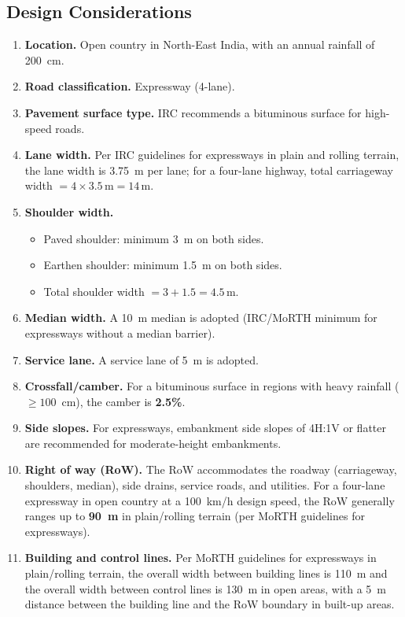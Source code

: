 \documentclass[11pt]{article}
\begin{document}
\subsection{Design Considerations}
\begin{enumerate}
  \item \textbf{Location.} Open country in North-East India, with an annual rainfall of 200~cm.
  \item \textbf{Road classification.} Expressway (4-lane).
  \item \textbf{Pavement surface type.} IRC recommends a bituminous surface for high-speed roads.
  \item \textbf{Lane width.} Per IRC guidelines for expressways in plain and rolling terrain, the lane
  width is 3.75~m per lane; for a four-lane highway, total carriageway width $= 4 \times 3.5\,\text{m} =
  14\,\text{m}$.
  \item \textbf{Shoulder width.}
  \begin{itemize}
    \item Paved shoulder: minimum 3~m on both sides.
    \item Earthen shoulder: minimum 1.5~m on both sides.
    \item Total shoulder width $= 3 + 1.5 = 4.5\,\text{m}$.
  \end{itemize}
  \item \textbf{Median width.} A 10~m median is adopted (IRC/MoRTH minimum for expressways without a
  median barrier).
  \item \textbf{Service lane.} A service lane of 5~m is adopted.
  \item \textbf{Crossfall/camber.} For a bituminous surface in regions with heavy rainfall
  ($\geq 100$~cm), the camber is \textbf{2.5\%}.
  \item \textbf{Side slopes.} For expressways, embankment side slopes of 4H:1V or flatter are recommended
  for moderate-height embankments.
  \item \textbf{Right of way (RoW).} The RoW accommodates the roadway (carriageway, shoulders, median),
  side drains, service roads, and utilities. For a four-lane expressway in open country at a 100~km/h
  design speed, the RoW generally ranges up to \textbf{90~m} in plain/rolling terrain (per MoRTH
  guidelines for expressways).
  \item \textbf{Building and control lines.} Per MoRTH guidelines for expressways in plain/rolling
  terrain, the overall width between building lines is 110~m and the overall width between control lines
  is 130~m in open areas, with a 5~m distance between the building line and the RoW boundary in built-up
  areas.
\end{enumerate}
\end{document}
